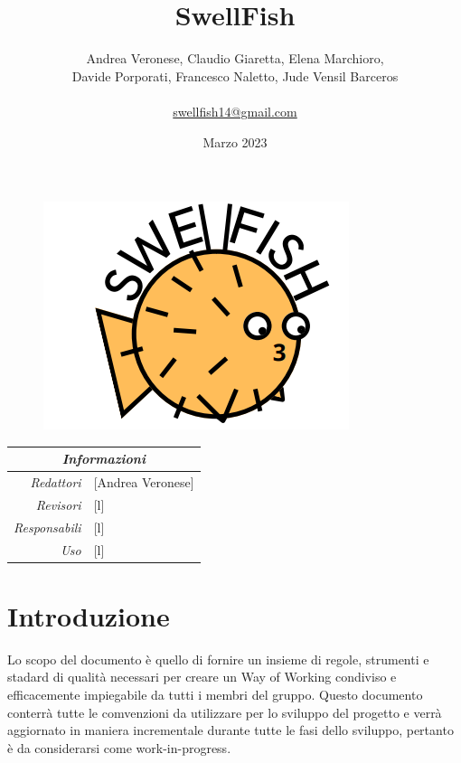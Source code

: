\documentclass[12pt]{article}
\begin{document}
\title{SwellFish}
\begin{figure}
\centering
\includegraphics[scale=0.5]{Swellfish_logo.png}
\end{figure}
\author{Andrea Veronese, Claudio Giaretta, Elena Marchioro,\\
Davide Porporati, Francesco Naletto, Jude Vensil Barceros \\ \\
 \href{swellfish14@gmail.com}{swellfish14@gmail.com} \\
} 
\date{Marzo 2023}



\maketitle
\begin{center}
    \begin{tabular}{r | l}
		\multicolumn{2}{c}{\textit{Informazioni}}\\
		\hline
		
			\textit{Redattori} &
			[Andrea Veronese]\makecell{}\\
		
			\textit{Revisori} &
			[l]\makecell{}\\
			\textit{Responsabili} &
			[l]\makecell{}\\
		      \textit{Uso} & 
                [l]\makecell{}\\
\end{tabular}
\end{center}


\tableofcontents
\printindex 
\section{Introduzione}
Lo scopo del documento è quello di fornire un insieme di regole, strumenti e stadard di qualità necessari per creare un Way of Working condiviso e efficacemente impiegabile da tutti i membri del gruppo.
Questo documento conterrà tutte le comvenzioni da utilizzare per lo sviluppo del progetto e verrà aggiornato in maniera incrementale durante tutte le fasi dello sviluppo, pertanto è da considerarsi come work-in-progress.
\end{document}
